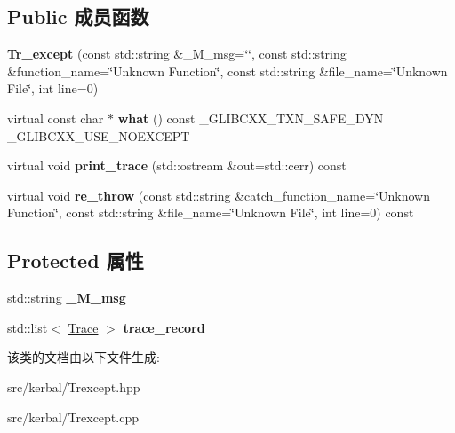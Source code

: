 \subsection*{Public 成员函数}
\begin{DoxyCompactItemize}
\item 
\mbox{\label{classkerbal_1_1traceable_1_1_tr__except_a1f6b8bf28b4409c46120179d8650ba93}} 
{\bfseries Tr\+\_\+except} (const std\+::string \&\+\_\+\+M\+\_\+msg=\char`\"{}\char`\"{}, const std\+::string \&function\+\_\+name=\char`\"{}Unknown Function\char`\"{}, const std\+::string \&file\+\_\+name=\char`\"{}Unknown File\char`\"{}, int line=0)
\item 
\mbox{\label{classkerbal_1_1traceable_1_1_tr__except_a7ff395a73c9b6721aa1847d2486239fc}} 
virtual const char $\ast$ {\bfseries what} () const \+\_\+\+G\+L\+I\+B\+C\+X\+X\+\_\+\+T\+X\+N\+\_\+\+S\+A\+F\+E\+\_\+\+D\+YN \+\_\+\+G\+L\+I\+B\+C\+X\+X\+\_\+\+U\+S\+E\+\_\+\+N\+O\+E\+X\+C\+E\+PT
\item 
\mbox{\label{classkerbal_1_1traceable_1_1_tr__except_aa2fb4e5783dff16dbe387f9f42dcdfe0}} 
virtual void {\bfseries print\+\_\+trace} (std\+::ostream \&out=std\+::cerr) const
\item 
\mbox{\label{classkerbal_1_1traceable_1_1_tr__except_af9315fa0298224e090578387935962be}} 
virtual void {\bfseries re\+\_\+throw} (const std\+::string \&catch\+\_\+function\+\_\+name=\char`\"{}Unknown Function\char`\"{}, const std\+::string \&file\+\_\+name=\char`\"{}Unknown File\char`\"{}, int line=0) const
\end{DoxyCompactItemize}
\subsection*{Protected 属性}
\begin{DoxyCompactItemize}
\item 
\mbox{\label{classkerbal_1_1traceable_1_1_tr__except_aef1f72279bbadc6f3cc6b8a9c36ec9ab}} 
std\+::string {\bfseries \+\_\+\+M\+\_\+msg}
\item 
\mbox{\label{classkerbal_1_1traceable_1_1_tr__except_a12f0843851f04e842237dd9852ce9fe6}} 
std\+::list$<$ \hyperlink{structkerbal_1_1traceable_1_1_tr__except_1_1_trace}{Trace} $>$ {\bfseries trace\+\_\+record}
\end{DoxyCompactItemize}


该类的文档由以下文件生成\+:\begin{DoxyCompactItemize}
\item 
src/kerbal/Trexcept.\+hpp\item 
src/kerbal/Trexcept.\+cpp\end{DoxyCompactItemize}
